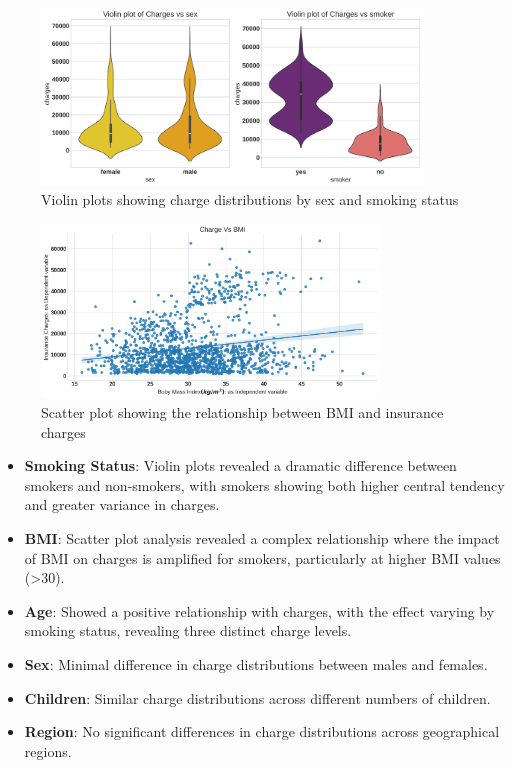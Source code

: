 \documentclass[12pt,a4paper]{article}
\begin{document}
\begin{figure}[H]
\centering
\includegraphics[width=0.9\textwidth]{violin_plots_sex_smoker.png}
\caption{Violin plots showing charge distributions by sex and smoking status}
\label{fig:violin_plots_sex_smoker}
\end{figure}

\begin{figure}[H]
\centering
\includegraphics[width=0.8\textwidth]{charges_vs_bmi.png}
\caption{Scatter plot showing the relationship between BMI and insurance charges}
\label{fig:charges_vs_bmi}
\end{figure}

\begin{itemize}
    \item \textbf{Smoking Status}: Violin plots revealed a dramatic difference between smokers and non-smokers, with smokers showing both higher central tendency and greater variance in charges.
    \item \textbf{BMI}: Scatter plot analysis revealed a complex relationship where the impact of BMI on charges is amplified for smokers, particularly at higher BMI values (>30).
    \item \textbf{Age}: Showed a positive relationship with charges, with the effect varying by smoking status, revealing three distinct charge levels.
    \item \textbf{Sex}: Minimal difference in charge distributions between males and females.
    \item \textbf{Children}: Similar charge distributions across different numbers of children.
    \item \textbf{Region}: No significant differences in charge distributions across geographical regions.
\end{itemize}
\end{document}

